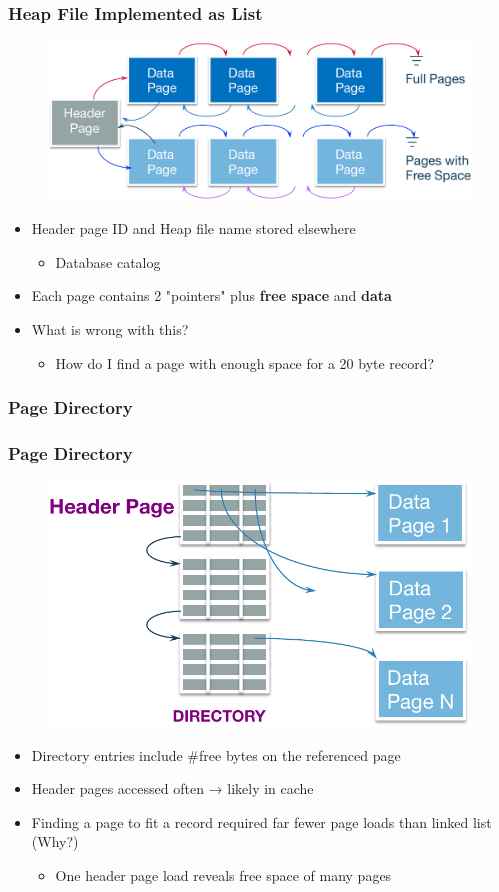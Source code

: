 \begin{frame}[fragile]
	\frametitle{Heap File Implemented as List}
	\begin{figure}
		\includegraphics[width=.7\linewidth]{figs/dbfile-heapfile2.pdf}
	\end{figure}
	\begin{itemize}
		\item Header page ID and Heap file name stored elsewhere
		\begin{itemize}
			\item Database catalog
		\end{itemize}
		\item Each page contains 2 "pointers" plus \textbf{free space} and \textbf{data}
		\item What is wrong with this?
		\begin{itemize}
			\item How do I find a page with enough space for a 20 byte record?
		\end{itemize}
	\end{itemize}
\end{frame}

\subsubsection{Page Directory}

\begin{frame}[fragile]
	\frametitle{Page Directory}
	\begin{figure}
		\includegraphics[width=.45\linewidth]{figs/dbfile-page-directory.pdf}
	\end{figure}
	\begin{itemize}
		\item Directory entries include \#free bytes on the referenced page
		\item Header pages accessed often → likely in cache
		\item Finding a page to fit a record required far fewer page loads than linked list (Why?)
		\begin{itemize}
			\item One header page load reveals free space of many pages
		\end{itemize}
	\end{itemize}
\end{frame}

